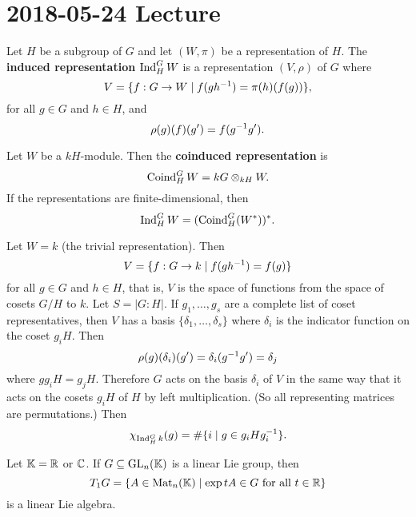 \section{2018-05-24 Lecture}

\begin{defn}
  Let $H$ be a subgroup of $G$ and let $(W,\pi)$ be a representation of $H$.
  The \textbf{induced representation} $\operatorname{Ind}_H^GW$ is a representation $(V,\rho)$ of $G$ where
  \[ V = \{ f: G \to W \mid f(gh^{-1})=\pi(h)(f(g)) \}, \]
  for all $g \in G$ and $h \in H$, and
  \[ \rho(g)(f)(g')=f(g^{-1} g'). \]
\end{defn}

\begin{defn}
  Let $W$ be a $kH$-module.
  Then the \textbf{coinduced representation} is
  \[ \operatorname{Coind}_H^GW = kG \otimes_{kH} W. \]
  If the representations are finite-dimensional, then
  \[ \operatorname{Ind}_H^GW = (\operatorname{Coind}_H^G(W^*))^*. \]
\end{defn}

\begin{exam}
  Let $W=k$ (the trivial representation).
  Then
  \[ V = \{ f: G \to k \mid f(gh^{-1})=f(g) \} \]
  for all $g \in G$ and $h \in H$, that is, $V$ is the space of functions from the space of cosets $G/H$ to $k$.
  Let $S=|G:H|$.
  If $g_1,\ldots,g_s$ are a complete list of coset representatives, then $V$ has a basis $\{\delta_1,\ldots,\delta_s\}$ where $\delta_i$ is the indicator function on the coset $g_iH$.
  Then
  \[ \rho(g)(\delta_i)(g') = \delta_i(g^{-1} g') = \delta_j \]
  where $gg_iH=g_jH$.
  Therefore $G$ acts on the basis $\delta_i$ of $V$ in the same way that it acts on the cosets $g_iH$ of $H$ by left multiplication.
  (So all representing matrices are permutations.)
  Then
  \[ \chi_{\operatorname{Ind}_H^Gk}(g) = \#\{i \mid g \in g_iHg_i^{-1}\}. \]
\end{exam}

\begin{prop}
  Let $\mathbb{K}=\mathbb{R}$ or $\mathbb{C}$.
  If $G \subseteq \operatorname{GL}_n(\mathbb{K})$ is a linear Lie group, then
  \[ T_1G = \{ A \in \operatorname{Mat}_n(\mathbb{K}) \mid \exp tA \in G \text{ for all } t \in \mathbb{R} \} \]
  is a linear Lie algebra.
\end{prop}

